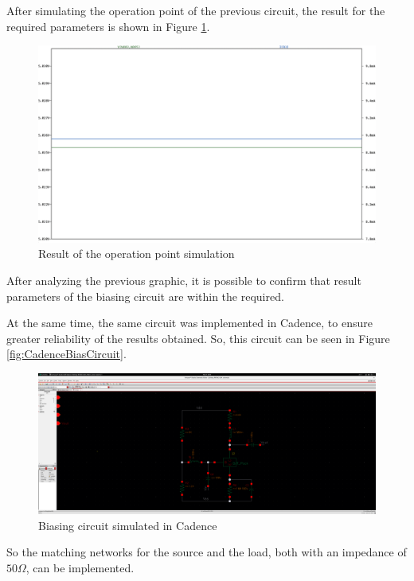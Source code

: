 After simulating the operation point of the previous circuit, the result for the required parameters is shown in Figure \ref{fig:SIMBias}.

\begin{figure}[H]
    \centering
    \includegraphics*[scale = 0.3]{Images/SIMBias.png}
    \caption{Result of the operation point simulation}
    \label{fig:SIMBias}
\end{figure}

After analyzing the previous graphic, it is possible to confirm that result parameters of the biasing circuit are within the required.

At the same time, the same circuit was implemented in Cadence, to ensure greater reliability of the results obtained. So, this circuit can be seen in Figure \ref{fig:CadenceBiasCircuit}.

\begin{figure}[H]
    \centering
    \includegraphics*[scale = 0.1]{Images/CadenceBiascircuit.png}
    \caption{Biasing circuit simulated in Cadence}
    \label{fig:CadenceBiasCircuitBiasCircuit}
\end{figure}

So the matching networks for the source and the load, both with an impedance of $50\Omega$, can be implemented.

